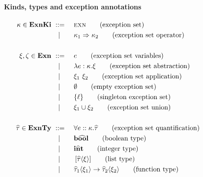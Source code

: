 \documentclass{llncs}
\newcommand{\ClassExnTy}{\mathbf{ExnTy}}
\newcommand{\ClassExn}{\mathbf{Exn}}
\newcommand{\ClassKind}{\mathbf{ExnKi}}
\newcommand{\Throws}[2]{#1\langle #2\rangle}    %
\newcommand{\ExnTy}{\widehat\tau}
\newcommand{\ExnTyBool}{\mathrm{b\widehat{oo}l}}    %
\newcommand{\ExnTyList}[2]{\left[\Throws{#1}{#2}\right]\!}
\newcommand{\ExnTyArr}[4]{\Throws{#1}{#2} \to \Throws{#3}{#4}}
\newcommand{\ExnForall}[1]{\forall {#1}.}           %
\newcommand{\Exn}{\xi}
\newcommand{\ExnAlt}{\zeta}
\newcommand{\ExnVar}{e}
\newcommand{\ExnCon}[1]{\{#1\}}
\newcommand{\ExnAbs}[3]{\lambda #1 : #2 . #3}
\newcommand{\ExnApp}[2]{#1\ #2}
\newcommand{\ExnUnion}[2]{#1 \cup #2}
\newcommand{\ExnEmpty}{\emptyset}
\newcommand{\ExnBool}{\mathbf{b\widehat{oo}l}}      %
\newcommand{\ExnInt}{\mathbf{i\widehat{n}t}}        %
\newcommand{\Kind}{\kappa}                          %
\newcommand{\KindEXN}{\textsc{exn}}
\newcommand{\KindArr}{\Rightarrow}
\newcommand{\ExnLbl}{\ell}
\begin{document}
\begin{figure}[h]
    \paragraph{Kinds, types and exception annotations}
    \begin{alignat}{2}
        \Kind \in \ClassKind &\ ::=\ &&\KindEXN \tag{exception set} \\
                             &\quad|  &&\Kind_1 \KindArr \Kind_2 \tag{exception set operator}\\
        \notag\\
        \Exn, \ExnAlt \in \ClassExn  &\ ::=\ &&\ExnVar \tag{exception set variables} \\
                            &\quad|  &&\ExnAbs{\ExnVar}{\Kind}{\Exn} \tag{exception set abstraction}\\
                            &\quad|    &&\ExnApp{\Exn_1}{\Exn_2} \tag{exception set application}\\
                            &\quad|    &&\ExnEmpty \tag{empty exception set} \\
                            &\quad|    &&\ExnCon{\ExnLbl} \tag{singleton exception set} \\
                            &\quad|    &&\ExnUnion{\Exn_1}{\Exn_2} \tag{exception set union} \\
    \notag\\
        \ExnTy \in \ClassExnTy &\ ::=\ &&\ExnForall{\ExnVar :: \Kind}\ExnTy \tag{exception set quantification} \\
                     &\quad|  &&\ExnBool \tag{boolean type} \\
                     &\quad|  &&\ExnInt  \tag{integer type} \\
                     &\quad|  &&\ExnTyList{\ExnTy}{\Exn} \tag{list type} \\
                     &\quad|  &&\ExnTyArr{\ExnTy_1}{\Exn_1}{\ExnTy_2}{\Exn_2} \tag{function type}
    \end{alignat}

\end{figure}
\end{document}
